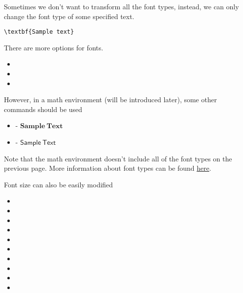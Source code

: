 \begin{frame}[fragile]
    Sometimes we don't want to transform  all the font types, instead, we can only change the font type of some specified text.
    \pause
    \begin{example}
        \begin{verbatim}
\textbf{Sample text}
		\end{verbatim}
    \end{example}
    \pause
    There are more options for fonts.
    \begin{itemize}
        \item {}
        \item {}
        \item {}
    \end{itemize}
    \pause
    However, in a math environment (will be introduced later), some other commands should be used
    \begin{itemize}
        \item {} - $\mathbf{Sample\ Text}$
        \item {} - $\mathsf{Sample\ Text}$
    \end{itemize}
    \pause
    Note that the math environment doesn't include all of the font types on the previous page. More information about font types can be found \href{http://www.cnblogs.com/make217/p/6123532.html}{here}.
\end{frame}

\begin{frame}
    Font size can also be easily modified
    \begin{itemize}
        \item {}
        \item {}
        \item {}
        \item {}
        \item {}
        \item {}
        \item {}
        \item {}
        \item {}
        \item {}
    \end{itemize}
\end{frame}

